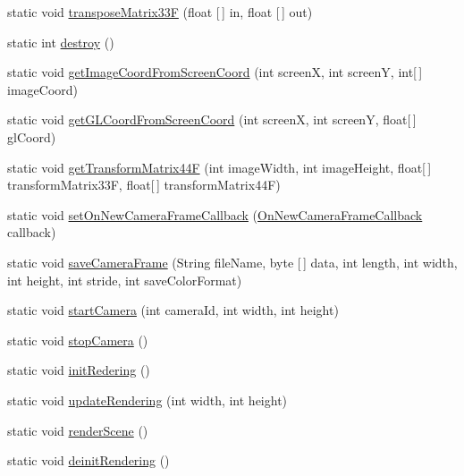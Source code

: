 \begin{DoxyCompactItemize}
static void \hyperlink{classcom_1_1maxst_1_1vidchaser_1_1_vid_chaser_a_p_i_a7883ba1837bd5c3f84ec45ca66414b05}{transpose\+Matrix33F} (float \mbox{[}$\,$\mbox{]} in, float \mbox{[}$\,$\mbox{]} out)
\item 
static int \hyperlink{classcom_1_1maxst_1_1vidchaser_1_1_vid_chaser_a_p_i_a89080c8433fe0a5361f5ca660908b183}{destroy} ()
\item 
static void \hyperlink{classcom_1_1maxst_1_1vidchaser_1_1_vid_chaser_a_p_i_ad862cc3057d072216e0f3a7b4e9e295b}{get\+Image\+Coord\+From\+Screen\+Coord} (int screenX, int screenY, int\mbox{[}$\,$\mbox{]} image\+Coord)
\item 
static void \hyperlink{classcom_1_1maxst_1_1vidchaser_1_1_vid_chaser_a_p_i_a023777164b60f04666b2e5b718580e03}{get\+G\+L\+Coord\+From\+Screen\+Coord} (int screenX, int screenY, float\mbox{[}$\,$\mbox{]} gl\+Coord)
\item 
static void \hyperlink{classcom_1_1maxst_1_1vidchaser_1_1_vid_chaser_a_p_i_a289c720643c1f900f956f2589a619871}{get\+Transform\+Matrix44F} (int image\+Width, int image\+Height, float\mbox{[}$\,$\mbox{]} transform\+Matrix33F, float\mbox{[}$\,$\mbox{]} transform\+Matrix44F)
\item 
static void \hyperlink{classcom_1_1maxst_1_1vidchaser_1_1_vid_chaser_a_p_i_a89cea03eb38771648663da04950aaec5}{set\+On\+New\+Camera\+Frame\+Callback} (\hyperlink{interfacecom_1_1maxst_1_1vidchaser_1_1_on_new_camera_frame_callback}{On\+New\+Camera\+Frame\+Callback} callback)
\item 
static void \hyperlink{classcom_1_1maxst_1_1vidchaser_1_1_vid_chaser_a_p_i_a80334a0ee1380fddc6a469facee88492}{save\+Camera\+Frame} (String file\+Name, byte \mbox{[}$\,$\mbox{]} data, int length, int width, int height, int stride, int save\+Color\+Format)
\item 
static void \hyperlink{classcom_1_1maxst_1_1vidchaser_1_1_vid_chaser_a_p_i_ab4f43383db7d47da64c1c2b9ab8167ac}{start\+Camera} (int camera\+Id, int width, int height)
\item 
static void \hyperlink{classcom_1_1maxst_1_1vidchaser_1_1_vid_chaser_a_p_i_af7092d1f3dcca228cb6a45f263e35120}{stop\+Camera} ()
\item 
static void \hyperlink{classcom_1_1maxst_1_1vidchaser_1_1_vid_chaser_a_p_i_af4e7ca30f3836348d7f5a2b375a25d28}{init\+Redering} ()
\item 
static void \hyperlink{classcom_1_1maxst_1_1vidchaser_1_1_vid_chaser_a_p_i_a72fa4502f5dcc8d1e765167be9a05cae}{update\+Rendering} (int width, int height)
\item 
static void \hyperlink{classcom_1_1maxst_1_1vidchaser_1_1_vid_chaser_a_p_i_a8a695391dde4caec8e85e5355769e202}{render\+Scene} ()
\item 
static void \hyperlink{classcom_1_1maxst_1_1vidchaser_1_1_vid_chaser_a_p_i_ab9d7cb7188771fac801aa2e9aefc6a83}{deinit\+Rendering} ()
\end{DoxyCompactItemize}



